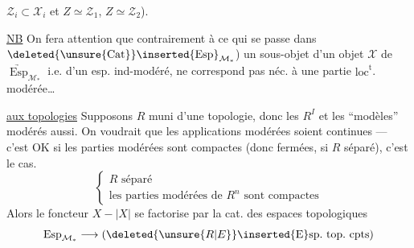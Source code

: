 $\mathcal Z_i\subset\mathcal X_i$ et $Z\simeq\mathcal Z_1$, $Z\simeq\mathcal Z_2$).

\uline{NB} On fera attention que contrairement à ce qui se passe dans $\deleted{\unsure{\operatorname{Cat}}}\inserted{\operatorname{Esp}}_{\mathcal M_*}$) un sous-objet d'un objet $\mathcal X$ de $\underrightarrow{\operatorname{Esp}}_{\mathcal M_*}$ i.e. d'un esp. ind-modéré, ne correspond pas néc. à une partie $\mathrm{loc}^{\mathrm t}$. modérée\ldots

\uline{ aux topologies} Supposons $R$ muni d'une topologie,  donc les $R^I$ et les ``modèles'' modérés aussi. On voudrait que les applications modérées soient continues --- c'est OK si les parties modérées sont compactes (donc fermées, si $R$ séparé), c'est le cas.  
\[
 \left\{\begin{array}{l}R\text{ séparé}\\
 \text{les parties modérées de }R^n\text{ sont compactes}
 \end{array}\right.
\]
Alors le foncteur $X\mathbin{-}|X|$ se factorise par la cat. des espaces topologiques
\[
 \operatorname{Esp}_{\mathcal M_*}\longrightarrow(\deleted{\unsure{R|E}}\inserted{\mathrm E}\mathrm{sp.\ top.\ cpts})
\]
